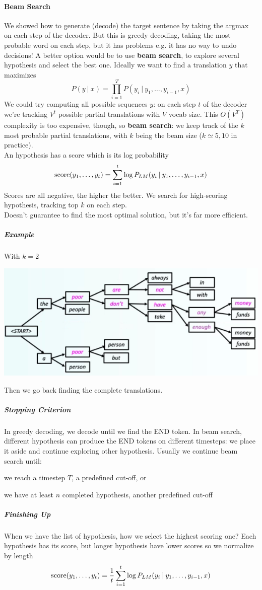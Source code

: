 \documentclass[10pt]{report}
\begin{document}
\paragraph{Beam Search} We showed how to generate (decode) the target sentence by taking the argmax on each step of the decoder. But this is greedy decoding, taking the most probable word on each step, but it has problems e.g. it has no way to undo decisions! A better option would be to use \textbf{beam search}, to explore several hypothesis and select the best one. Ideally we want to find a translation $y$ that maximizes $$P(y\:|\:x) = \prod_{i=1}^T P(y_i\:|\:y_1,\ldots,y_{i-1},x)$$
We could try computing all possible sequences $y$: on each step $t$ of the decoder we're tracking $V^t$ possible partial translations with $V$ vocab size. This $O(V^T)$ complexity is too expensive, though, so \textbf{beam search}: we keep track of the $k$ most probable partial translations, with $k$ being the beam size ($k\simeq 5, 10$ in practice).\\
An hypothesis has a score which is its log probability $$\hbox{score}(y_1,\ldots,y_t) = \sum_{i=1}^t \log P_{LM}(y_i\:|\:y_1,\ldots,y_{i-1},x)$$
Scores are all negative, the higher the better. We search for high-scoring hypothesis, tracking top $k$ on each step.\\
Doesn't guarantee to find the most optimal solution, but it's far more efficient.
\subparagraph{Example} With $k=2$
\begin{center}
	\includegraphics[scale=0.6]{65.png}
\end{center}
Then we go back finding the complete translations.
\subparagraph{Stopping Criterion} In greedy decoding, we decode until we find the END token. In beam search, different hypothesis can produce the END tokens on different timesteps: we place it aside and continue exploring other hypothesis. Usually we continue beam search until:\begin{list}{}{}
	\item we reach a timestep $T$, a predefined cut-off, or
	\item we have at least $n$ completed hypothesis, another predefined cut-off
\end{list}
\subparagraph{Finishing Up} When we have the list of hypothesis, how we select the highest scoring one? Each hypothesis has its score, but longer hypothesis have lower scores so we normalize by length
$$\hbox{score}(y_1,\ldots,y_t) =\frac{1}{t}\sum_{i=1}^t \log P_{LM}(y_i\:|\:y_1,\ldots,y_{i-1},x)$$
\end{document}
